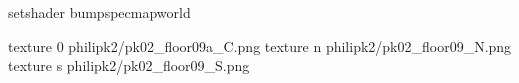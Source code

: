 setshader bumpspecmapworld

texture 0 philipk2/pk02_floor09a_C.png
texture n philipk2/pk02_floor09_N.png
texture s philipk2/pk02_floor09_S.png

